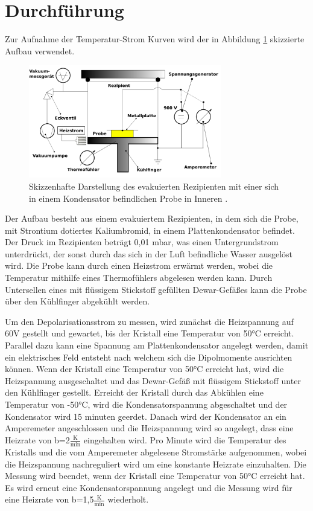 \section{Durchführung}
\label{sec:durch}
Zur Aufnahme der Temperatur-Strom Kurven wird der in Abbildung \ref{fig:aufbau} skizzierte Aufbau verwendet.

\begin{figure}
    \centering
    \includegraphics[width=0.75\textwidth]{aufbau.png}
    \caption{Skizzenhafte Darstellung des evakuierten Rezipienten mit einer sich in einem Kondensator befindlichen Probe in Inneren \cite{V48}.}
    \label{fig:aufbau}
  \end{figure}

\noindent
Der Aufbau besteht aus einem evakuiertem Rezipienten, in dem sich die Probe, mit Strontium dotiertes Kaliumbromid, in einem Plattenkondensator befindet.
Der Druck im Rezipienten beträgt 0,01 mbar, was einen Untergrundstrom unterdrückt, der sonst durch das sich in der Luft befindliche Wasser ausgelöst wird.
Die Probe kann durch einen Heizstrom erwärmt werden, wobei die Temperatur mithilfe eines Thermofühlers abgelesen werden kann.
Durch Untersellen eines mit flüssigem Stickstoff gefüllten Dewar-Gefäßes kann die Probe über den Kühlfinger abgekühlt werden. 


\noindent
Um den Depolarisationsstrom zu messen, wird zunächst die Heizspannung auf 60V gestellt und gewartet, bis der Kristall eine Temperatur von 50°C erreicht.
Parallel dazu kann eine Spannung am Plattenkondensator angelegt werden, damit ein elektrisches Feld entsteht nach welchem sich die Dipolmomente ausrichten können.
Wenn der Kristall eine Temperatur von 50°C erreicht hat, wird die Heizspannung ausgeschaltet und das Dewar-Gefäß mit flüssigem Stickstoff unter den Kühlfinger gestellt.
Erreicht der Kristall durch das Abkühlen eine Temperatur von -50°C, wird die Kondensatorspannung abgeschaltet und der Kondensator wird 15 minuten geerdet.
Danach wird der Kondensator an ein Amperemeter angeschlossen und die Heizspannung wird so angelegt, dass eine Heizrate von b=2$\frac{\text{K}}{\text{min}}$ eingehalten wird.
Pro Minute wird die Temperatur des Kristalls und die vom Amperemeter abgelesene Stromstärke aufgenommen, wobei die Heizspannung nachreguliert wird um eine konstante Heizrate einzuhalten.
Die Messung wird beendet, wenn der Kristall eine Temperatur von 50°C erreicht hat.
Es wird erneut eine Kondensatorspannung angelegt und die Messung wird für eine Heizrate von b=1,5$\frac{\text{K}}{\text{min}}$ wiederholt.


